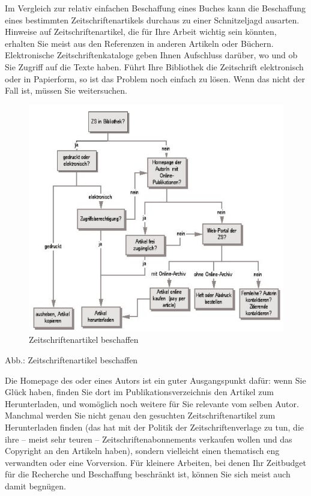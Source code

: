 \documentclass[]{book}
\theoremstyle{definition}
\theoremstyle{definition}
\theoremstyle{definition}
\theoremstyle{remark}
\begin{document}
Im Vergleich zur relativ einfachen Beschaffung eines Buches kann die
Beschaffung eines bestimmten Zeitschriftenartikels durchaus zu einer
Schnitzeljagd ausarten. Hinweise auf Zeitschriftenartikel, die für Ihre
Arbeit wichtig sein könnten, erhalten Sie meist aus den Referenzen in
anderen Artikeln oder Büchern. Elektronische Zeitschriftenkataloge geben
Ihnen Aufschluss darüber, wo und ob Sie Zugriff auf die Texte haben.
Führt Ihre Bibliothek die Zeitschrift elektronisch oder in Papierform,
so ist das Problem noch einfach zu lösen. Wenn das nicht der Fall ist,
müssen Sie weitersuchen.

\begin{figure}

{\centering \includegraphics{images/recherchieren-zeitschriften-beschaffen-min} 

}

\caption{Zeitschriftenartikel beschaffen}\label{fig:unnamed-chunk-10}
\end{figure}

Abb.: Zeitschriftenartikel beschaffen

Die Homepage des oder eines Autors ist ein guter Ausgangspunkt dafür:
wenn Sie Glück haben, finden Sie dort im Publikationsverzeichnis den
Artikel zum Herunterladen, und womöglich noch weitere für Sie relevante
vom selben Autor. Manchmal werden Sie nicht genau den gesuchten
Zeitschriftenartikel zum Herunterladen finden (das hat mit der Politik
der Zeitschriftenverlage zu tun, die ihre -- meist sehr teuren --
Zeitschriftenabonnements verkaufen wollen und das Copyright an den
Artikeln haben), sondern vielleicht einen thematisch eng verwandten oder
eine Vorversion. Für kleinere Arbeiten, bei denen Ihr Zeitbudget für die
Recherche und Beschaffung beschränkt ist, können Sie sich meist auch
damit begnügen.
\end{document}
